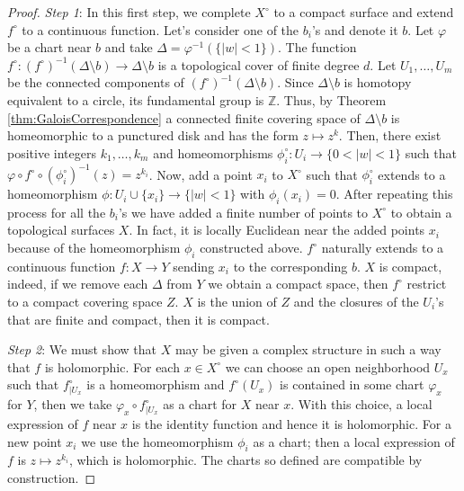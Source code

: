 \documentclass[12pt,a4paper,openright,twoside]{report}
\theoremstyle{definition} %
\def \Z {\mathbb{Z}}
\begin{document}
\begin{proof}
    \textit{Step 1}: In this first step, we complete \(X^{\circ}\) to a compact surface and extend \(f^{\circ}\) to a continuous function. Let's consider one of the \(b_i\)'s and denote it \(b\). Let \(\varphi\) be a chart near \(b\) and take \(\Delta = \varphi^{-1}(\{|w| < 1\})\). The function \(f^{\circ} : (f^{\circ})^{-1}(\Delta \setminus b) \to \Delta \setminus b \) is a topological cover of finite degree \(d\). Let \(U_1, \ldots, U_m\) be the connected components of \((f^{\circ})^{-1}(\Delta \setminus b)\). Since \(\Delta \setminus b\) is homotopy equivalent to a circle, its fundamental group is \(\Z\). Thus, by Theorem \ref{thm:GaloisCorrespondence} a connected finite covering space of \(\Delta \setminus b\) is homeomorphic to a punctured disk and has the form \(z \mapsto z^k\). Then, there exist positive integers \( k_1, \ldots, k_m\) and homeomorphisms \(\phi_i^{\circ}: U_i \to \{0 < |w| < 1\}\) such that \(\varphi \circ f^{\circ} \circ (\phi_i^{\circ})^{-1} (z) = z^{k_i}\). Now, add a point \(x_i\) to \(X^{\circ}\) such that \(\phi_i^{\circ}\) extends to a homeomorphism \(\phi : U_i \cup \{x_i\} \to \{|w| < 1\}\) with \(\phi_i(x_i)=0\). After repeating this process for all the \(b_i\)'s we have added a finite number of points to \(X^{\circ}\) to obtain a topological surfaces \(X\). In fact, it is locally Euclidean near the added points \(x_i\) because of the homeomorphism \(\phi_i\) constructed above. \(f^{\circ}\) naturally extends to a continuous function \(f:X \to Y\) sending \(x_i\) to the corresponding \(b\). \(X\) is compact, indeed, if we remove each \(\Delta\) from \(Y\) we obtain a compact space, then \(f^{\circ}\) restrict to a compact covering space \(Z\). \(X\) is the union of \(Z\) and the closures of the \(U_i\)'s that are finite and compact, then it is compact.
    
    \textit{Step 2}: We must show that \(X\) may be given a complex structure in such a way that \(f\) is holomorphic. For each \(x \in X^{\circ}\) we can choose an open neighborhood \(U_x\) such that \(f^{\circ}_{|U_x}\) is a homeomorphism and \(f^{\circ}(U_x)\) is contained in some chart \(\varphi_x\) for \(Y\), then we take \(\varphi_x \circ f^{\circ}_{|U_x}\) as a chart for \(X\) near \(x\). With this choice, a local expression of \(f\) near \(x\) is the identity function and hence it is holomorphic. For a new point \(x_i\) we use the homeomorphism \(\phi_i\) as a chart; then a local expression of \(f\) is \(z \mapsto z^{k_i}\), which is holomorphic. The charts so defined are compatible by construction.
\end{proof}
\end{document}
